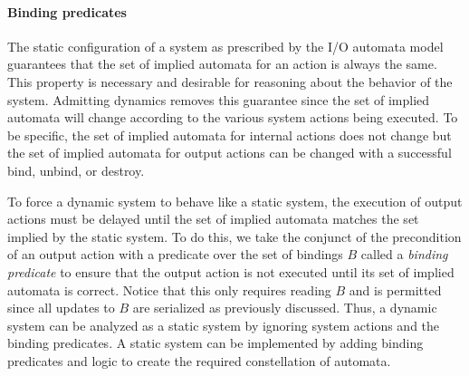 \paragraph*{Binding predicates}
The static configuration of a system as prescribed by the I/O automata model guarantees that the set of implied automata for an action is always the same.
This property is necessary and desirable for reasoning about the behavior of the system.
Admitting dynamics removes this guarantee since the set of implied automata will change according to the various system actions being executed.
To be specific, the set of implied automata for internal actions does not change but the set of implied automata for output actions can be changed with a successful bind, unbind, or destroy.

To force a dynamic system to behave like a static system, the execution of output actions must be delayed until the set of implied automata matches the set implied by the static system.
To do this, we take the conjunct of the precondition of an output action with a predicate over the set of bindings $B$ called a \emph{binding predicate} to ensure that the output action is not executed until its set of implied automata is correct.
Notice that this only requires reading $B$ and is permitted since all updates to $B$ are serialized as previously discussed.
Thus, a dynamic system can be analyzed as a static system by ignoring system actions and the binding predicates.
A static system can be implemented by adding binding predicates and logic to create the required constellation of automata.
